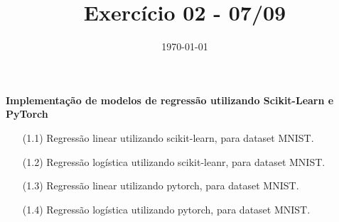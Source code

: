 \documentclass[a4paper]{article}
\date{\today}
\title{Exercício 02 - 07/09}
\begin{document}
    \header{}

\textbf{Implementação de modelos de regressão utilizando Scikit-Learn e PyTorch}
\begin{center}
\begin{itemize}
  \item[(1.1)] Regressão linear utilizando scikit-learn, para dataset MNIST.
  \item[(1.2)] Regressão logística utilizando scikit-leanr, para dataset MNIST.
  \item[(1.3)] Regressão linear utilizando pytorch, para dataset MNIST.
  \item[(1.4)] Regressão logística utilizando pytorch, para dataset MNIST.
\end{itemize}
\end{center}

    \begin{answer}[Ítem 1.1]
    \end{answer}

    \begin{answer}[Ítem 1.2]
    \end{answer}

    \begin{answer}[Ítem 1.3]
    \end{answer}

    \begin{answer}[Ítem 1.4]
    \end{answer}
\end{document}
